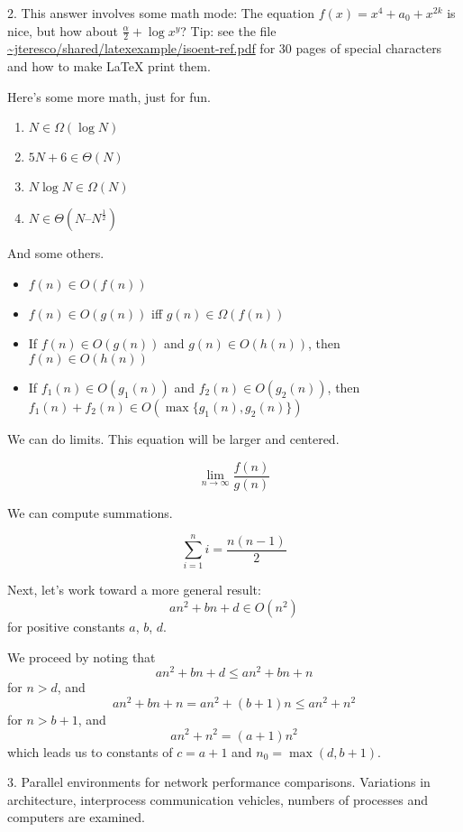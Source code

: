 \documentclass[12pt]{article}
\begin{document}
\bigskip

2.  This answer involves some math mode: The equation $f(x) = x^4 +
a_0 + x^{2k}$ is nice, but how about $\frac{\alpha}{2} + \log x^y$?
Tip: see the file \url{~jteresco/shared/latexexample/isoent-ref.pdf}
for 30 pages of special characters and how to make \LaTeX{} print
them.

Here's some more math, just for fun.

\begin{enumerate}
  \item $N \in \Omega(\log N)$
  \item $5N + 6 \in \Theta(N)$
  \item $N \log N \in \Omega(N)$
  \item $N \in \Theta(N – N^{\frac12})$
\end{enumerate}

And some others.


\begin{itemize}

\item $f(n) \in O(f(n))$

\item $f(n) \in O(g(n))$ iff $g(n) \in \Omega(f(n))$

\item If $f(n) \in O(g(n))$ and $g(n) \in O(h(n))$, then $f(n) \in
  O(h(n))$

\item If $f_1(n) \in O(g_1(n))$ and $f_2(n) \in O(g_2(n))$, then
  $f_1(n) + f_2(n) \in O(\max\{g_1(n),g_2(n)\})$

\end{itemize}


We can do limits.  This equation will be larger and centered.

$$
\lim_{n\to\infty}\frac{f(n)}{g(n)}
$$

We can compute summations.

$$
\sum_{i=1}^n i = \frac{n(n-1)}{2}
$$

Next, let's work toward a more general result:
$$
an^2 + bn + d \in O(n^2)
$$
for positive constants $a$, $b$, $d$.

We proceed by noting that
$$
an^2 + bn + d \leq an^2 + bn + n
$$
for $n>d$, and
$$
an^2 + bn + n = an^2 + (b+1)n \leq an^2 + n^2
$$
for $n>b+1$, and
$$
an^2 + n^2 = (a+1)n^2
$$
which leads us to constants of $c=a+1$ and $n_0=\max(d,b+1)$.


\bigskip

3.  Parallel environments for network performance comparisons.
Variations in architecture, interprocess communication vehicles,
numbers of processes and computers are examined.
\end{document}
